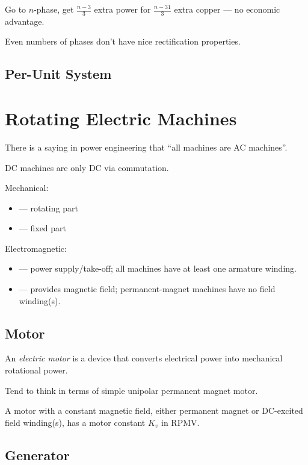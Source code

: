 \documentclass[11pt]{article}
\begin{document}
Go to $n$-phase, get $\frac{n-3}{3}$ extra power for $\frac{n-31}{3}$
extra copper --- no economic advantage. 

Even numbers of phases don't have nice rectification properties.



\subsection{Per-Unit System}


\section{Rotating Electric Machines}

There is a saying in power engineering that ``all machines are
AC machines''.

DC machines are only DC via commutation.

Mechanical:
\begin{itemize}
  \item {} --- rotating part
  \item {} --- fixed part
\end{itemize}

Electromagnetic:
\begin{itemize}
  \item {} --- power supply/take-off; all machines have at least one armature winding. 
  \item {} --- provides magnetic field; permanent-magnet machines have no field winding(s).
\end{itemize}


\subsection{Motor}

An \emph{electric motor} is a device that converts electrical power
into mechanical rotational power.

Tend to think in terms of simple unipolar permanent magnet motor.

A motor with a constant magnetic field, either permanent magnet or
DC-excited field winding(s), has a motor constant $K_v$ in
\unit{RPM}{V}.


\subsection{Generator}
\end{document}
